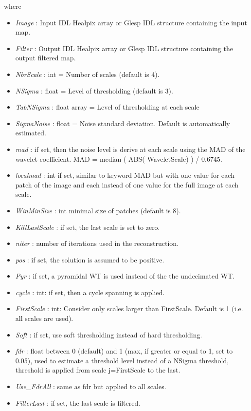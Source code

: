 where
\begin{itemize}
\item {\em Image} : Input IDL Healpix array or Glesp IDL structure containing the input map.
\item {\em Filter} : Output IDL Healpix array or Glesp IDL structure containing the output filtered map.
\item {\em NbrScale} : int = Number of scales (default is 4).
\item {\em NSigma} : float = Level of thresholding (default is 3).
\item {\em TabNSigma} : float array = Level of thresholding at each scale
\item {\em SigmaNoise} : float = Noise standard deviation. Default is automatically estimated.
\item {\em mad} : if set, then the noise level is derive at each scale using the MAD of the wavelet coefficient. MAD = median ( ABS( WaveletScale) ) / 0.6745.
\item {\em localmad} : int if set, similar to keyword MAD but with one value for each patch of the image and each instead of one value for the full image at each scale.
\item {\em WinMinSize} : int minimal size of patches (default is 8).
\item {\em KillLastScale} : if set, the last scale is set to zero.
\item {\em niter} : number of iterations used in the reconstruction.
\item {\em pos} : if set, the solution is assumed to be positive.
\item {\em Pyr} : if set, a pyramidal WT is used instead of the the undecimated WT.
\item {\em cycle} : int: if set, then a cycle spanning is applied.
\item {\em FirstScale} : int: Consider only scales larger than FirstScale. Default is 1 (i.e. all scales are used).
\item {\em Soft} : if set, use soft thresholding instead of hard thresholding.
\item {\em fdr} : float between 0 (default) and 1 (max, if greater or equal to 1, set to 0.05), used to estimate a threshold level 
instead of a NSigma threshold, threshold is applied from scale j=FirstScale to the last.
\item {\em Use\_FdrAll} : same as fdr but applied to all scales.
\item {\em FilterLast} : if set, the last scale is filtered.

\end{itemize}
